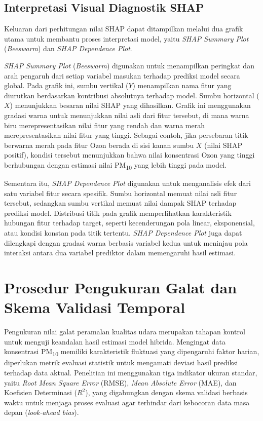 \subsection{Interpretasi Visual Diagnostik SHAP}

Keluaran dari perhitungan nilai SHAP dapat ditampilkan melalui dua grafik utama untuk membantu proses interpretasi model, yaitu \textit{SHAP Summary Plot} (\textit{Beeswarm}) dan \textit{SHAP Dependence Plot}.

\textit{SHAP Summary Plot} (\textit{Beeswarm}) digunakan untuk menampilkan peringkat dan arah pengaruh dari setiap variabel masukan terhadap prediksi model secara global. Pada grafik ini, sumbu vertikal ($Y$) menampilkan nama fitur yang diurutkan berdasarkan kontribusi absolutnya terhadap model. Sumbu horizontal ($X$) menunjukkan besaran nilai SHAP yang dihasilkan. Grafik ini menggunakan gradasi warna untuk menunjukkan nilai asli dari fitur tersebut, di mana warna biru merepresentasikan nilai fitur yang rendah dan warna merah merepresentasikan nilai fitur yang tinggi. Sebagai contoh, jika persebaran titik berwarna merah pada fitur Ozon berada di sisi kanan sumbu $X$ (nilai SHAP positif), kondisi tersebut menunjukkan bahwa nilai konsentrasi Ozon yang tinggi berhubungan dengan estimasi nilai \MakeUppercase{pm}\textsubscript{10} yang lebih tinggi pada model.

Sementara itu, \textit{SHAP Dependence Plot} digunakan untuk menganalisis efek dari satu variabel fitur secara spesifik. Sumbu horizontal memuat nilai asli fitur tersebut, sedangkan sumbu vertikal memuat nilai dampak SHAP terhadap prediksi model. Distribusi titik pada grafik memperlihatkan karakteristik hubungan fitur terhadap target, seperti kecenderungan pola linear, eksponensial, atau kondisi konstan pada titik tertentu. \textit{SHAP Dependence Plot} juga dapat dilengkapi dengan gradasi warna berbasis variabel kedua untuk meninjau pola interaksi antara dua variabel prediktor dalam memengaruhi hasil estimasi.

\section{Prosedur Pengukuran Galat dan Skema Validasi Temporal}

Pengukuran nilai galat peramalan kualitas udara merupakan tahapan kontrol untuk menguji keandalan hasil estimasi model hibrida. Mengingat data konsentrasi PM\textsubscript{10} memiliki karakteristik fluktuasi yang dipengaruhi faktor harian, diperlukan metrik evaluasi statistik untuk mengamati deviasi hasil prediksi terhadap data aktual. Penelitian ini menggunakan tiga indikator ukuran standar, yaitu \textit{Root Mean Square Error} (RMSE), \textit{Mean Absolute Error} (MAE), dan Koefisien Determinasi ($R^2$), yang digabungkan dengan skema validasi berbasis waktu untuk menjaga proses evaluasi agar terhindar dari kebocoran data masa depan (\textit{look-ahead bias}).

